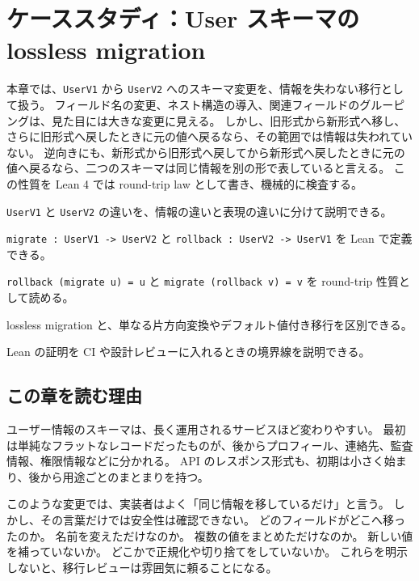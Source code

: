 \chapter{ケーススタディ：User スキーマの lossless migration}
\label{chap:ch22_user_schema_lossless_migration}

\begin{chapterabstract}
本章では、\texttt{UserV1} から \texttt{UserV2} へのスキーマ変更を、情報を失わない移行として扱う。
フィールド名の変更、ネスト構造の導入、関連フィールドのグルーピングは、見た目には大きな変更に見える。
しかし、旧形式から新形式へ移し、さらに旧形式へ戻したときに元の値へ戻るなら、その範囲では情報は失われていない。
逆向きにも、新形式から旧形式へ戻してから新形式へ戻したときに元の値へ戻るなら、二つのスキーマは同じ情報を別の形で表していると言える。
この性質を Lean 4 では round-trip law として書き、機械的に検査する。
\end{chapterabstract}

\begin{learninggoals}
\item \texttt{UserV1} と \texttt{UserV2} の違いを、情報の違いと表現の違いに分けて説明できる。
\item \texttt{migrate : UserV1 -> UserV2} と \texttt{rollback : UserV2 -> UserV1} を Lean で定義できる。
\item \texttt{rollback (migrate u) = u} と \texttt{migrate (rollback v) = v} を round-trip 性質として読める。
\item lossless migration と、単なる片方向変換やデフォルト値付き移行を区別できる。
\item Lean の証明を CI や設計レビューに入れるときの境界線を説明できる。
\end{learninggoals}

\section{この章を読む理由}

ユーザー情報のスキーマは、長く運用されるサービスほど変わりやすい。
最初は単純なフラットなレコードだったものが、後からプロフィール、連絡先、監査情報、権限情報などに分かれる。
API のレスポンス形式も、初期は小さく始まり、後から用途ごとのまとまりを持つ。

このような変更では、実装者はよく「同じ情報を移しているだけ」と言う。
しかし、その言葉だけでは安全性は確認できない。
どのフィールドがどこへ移ったのか。
名前を変えただけなのか。
複数の値をまとめただけなのか。
新しい値を補っていないか。
どこかで正規化や切り捨てをしていないか。
これらを明示しないと、移行レビューは雰囲気に頼ることになる。

